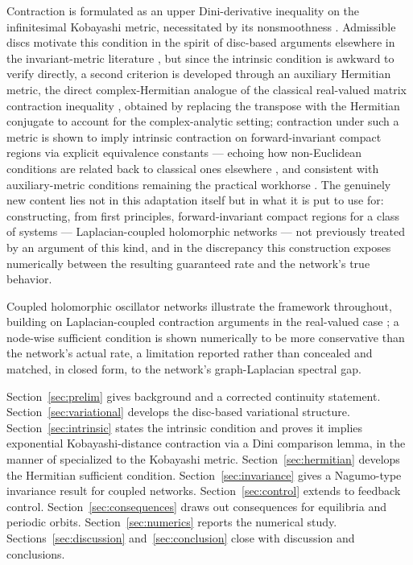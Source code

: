 \documentclass[preprint,12pt,authoryear]{elsarticle}
\begin{document}
Contraction is formulated as an upper Dini-derivative inequality on the infinitesimal Kobayashi metric, necessitated by its nonsmoothness \cite{sarkarad2023localization}. Admissible discs motivate this condition in the spirit of disc-based arguments elsewhere in the invariant-metric literature \cite{nikolov2023visibility,bharali2023unbounded}, but since the intrinsic condition is awkward to verify directly, a second criterion is developed through an auxiliary Hermitian metric, the direct complex-Hermitian analogue of the classical real-valued matrix contraction inequality \cite{lohmiller1998contraction}, obtained by replacing the transpose with the Hermitian conjugate to account for the complex-analytic setting; contraction under such a metric is shown to imply intrinsic contraction on forward-invariant compact regions via explicit equivalence constants --- echoing how non-Euclidean conditions are related back to classical ones elsewhere \cite{davydov2022noneuclidean,bullo2024ctds}, and consistent with auxiliary-metric conditions remaining the practical workhorse \cite{alradhawi2023structural,kawano2023lmi}. The genuinely new content lies not in this adaptation itself but in what it is put to use for: constructing, from first principles, forward-invariant compact regions for a class of systems --- Laplacian-coupled holomorphic networks --- not previously treated by an argument of this kind, and in the discrepancy this construction exposes numerically between the resulting guaranteed rate and the network's true behavior.

Coupled holomorphic oscillator networks illustrate the framework throughout, building on Laplacian-coupled contraction arguments in the real-valued case \cite{alradhawi2023structural}; a node-wise sufficient condition is shown numerically to be more conservative than the network's actual rate, a limitation reported rather than concealed and matched, in closed form, to the network's graph-Laplacian spectral gap.

Section~\ref{sec:prelim} gives background and a corrected continuity statement. Section~\ref{sec:variational} develops the disc-based variational structure. Section~\ref{sec:intrinsic} states the intrinsic condition and proves it implies exponential Kobayashi-distance contraction via a Dini comparison lemma, in the manner of \cite{forni2014differential} specialized to the Kobayashi metric. Section~\ref{sec:hermitian} develops the Hermitian sufficient condition. Section~\ref{sec:invariance} gives a Nagumo-type invariance result for coupled networks. Section~\ref{sec:control} extends to feedback control. Section~\ref{sec:consequences} draws out consequences for equilibria and periodic orbits. Section~\ref{sec:numerics} reports the numerical study. Sections~\ref{sec:discussion} and~\ref{sec:conclusion} close with discussion and conclusions.
\end{document}

